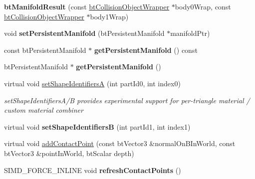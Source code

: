 \begin{DoxyCompactItemize}
\item 
\hypertarget{classbt_manifold_result_a012034766365adbebc5a4430f6dfa955}{{\bfseries bt\+Manifold\+Result} (const \hyperlink{structbt_collision_object_wrapper}{bt\+Collision\+Object\+Wrapper} $\ast$body0\+Wrap, const \hyperlink{structbt_collision_object_wrapper}{bt\+Collision\+Object\+Wrapper} $\ast$body1\+Wrap)}\label{classbt_manifold_result_a012034766365adbebc5a4430f6dfa955}

\item 
\hypertarget{classbt_manifold_result_a7a46d46b9a13c2896695e458c1d6df1f}{void {\bfseries set\+Persistent\+Manifold} (bt\+Persistent\+Manifold $\ast$manifold\+Ptr)}\label{classbt_manifold_result_a7a46d46b9a13c2896695e458c1d6df1f}

\item 
\hypertarget{classbt_manifold_result_a1c5ab928075fd6a12ebcf54e7e95b534}{const bt\+Persistent\+Manifold $\ast$ {\bfseries get\+Persistent\+Manifold} () const }\label{classbt_manifold_result_a1c5ab928075fd6a12ebcf54e7e95b534}

\item 
\hypertarget{classbt_manifold_result_a4e02b9721e32500c1af01fb775edf14e}{bt\+Persistent\+Manifold $\ast$ {\bfseries get\+Persistent\+Manifold} ()}\label{classbt_manifold_result_a4e02b9721e32500c1af01fb775edf14e}

\item 
\hypertarget{classbt_manifold_result_a01f472fc7b6d431845d22f55842f029d}{virtual void \hyperlink{classbt_manifold_result_a01f472fc7b6d431845d22f55842f029d}{set\+Shape\+Identifiers\+A} (int part\+Id0, int index0)}\label{classbt_manifold_result_a01f472fc7b6d431845d22f55842f029d}

\begin{DoxyCompactList}\small\item\em set\+Shape\+Identifiers\+A/\+B provides experimental support for per-\/triangle material / custom material combiner \end{DoxyCompactList}\item 
\hypertarget{classbt_manifold_result_a95a5dab38f08b08af1feb6756d60a681}{virtual void {\bfseries set\+Shape\+Identifiers\+B} (int part\+Id1, int index1)}\label{classbt_manifold_result_a95a5dab38f08b08af1feb6756d60a681}

\item 
virtual void \hyperlink{classbt_manifold_result_aebe32f0c202d988d0458e88d768602c6}{add\+Contact\+Point} (const bt\+Vector3 \&normal\+On\+B\+In\+World, const bt\+Vector3 \&point\+In\+World, bt\+Scalar depth)
\item 
\hypertarget{classbt_manifold_result_adbcfd865252ac9dc8a3543f404e2dcf1}{S\+I\+M\+D\+\_\+\+F\+O\+R\+C\+E\+\_\+\+I\+N\+L\+I\+N\+E void {\bfseries refresh\+Contact\+Points} ()}\label{classbt_manifold_result_adbcfd865252ac9dc8a3543f404e2dcf1}


\end{DoxyCompactItemize}
